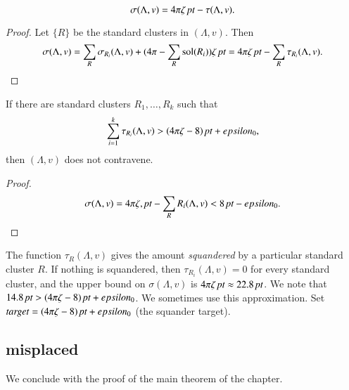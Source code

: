 \begin{lemma}
    $$\sigma(\Lambda,v) = {4\pi \zeta\,\hbox{\it pt}} - \tau(\Lambda,v).$$
\end{lemma}

\begin{proof} Let $\{R\}$ be the standard clusters in $(\Lambda,v)$. Then
    $$
    \sigma(\Lambda,v) = \sum_R\sigma_{R_i}(\Lambda,v) +
        (4\pi-\sum_R\operatorname{sol}(R_i))\zeta\,\hbox{\it pt} = 4\pi \zeta\,\hbox{\it pt} - \sum_R\tau_{R_i}(\Lambda,v).
    $$
\end{proof}


\begin{lemma}
If there are standard clusters $R_1,\ldots,R_k$ such that
$$\sum_{i=1}^k \tau_{R_i}(\Lambda,v)> (4\pi\zeta-8)\,\hbox{\it pt} + epsilon_0,$$
then $(\Lambda,v)$ does not contravene.
\end{lemma}

\begin{proof}
$$\sigma(\Lambda,v) = 4\pi\zeta,\hbox{\it pt} -\sum_R{R_i}(\Lambda,v) < 8\,\hbox{\it pt} - epsilon_0.$$
\end{proof}


The function $\tau_R(\Lambda,v)$ gives the amount {\it squandered\/} by a
particular standard cluster $R$.  If nothing is squandered, then
$\tau_{R_i}(\Lambda,v)=0$ for every standard cluster, and the upper bound
on $\sigma(\Lambda,v)$ is
    $4\pi\zeta\,\hbox{\it pt}\approx 22.8\,\hbox{\it pt}$.
We note that $14.8\,\hbox{\it pt} > (4\pi\zeta-8)\,\hbox{\it pt}+epsilon_0$.  We sometimes use this
approximation.  Set $\operatorname{\it{target}} = (4\pi\zeta-8)\,\hbox{\it pt}+epsilon_0$ (the squander target).










\subsection{misplaced}


We conclude with the proof of the main theorem of the chapter.

